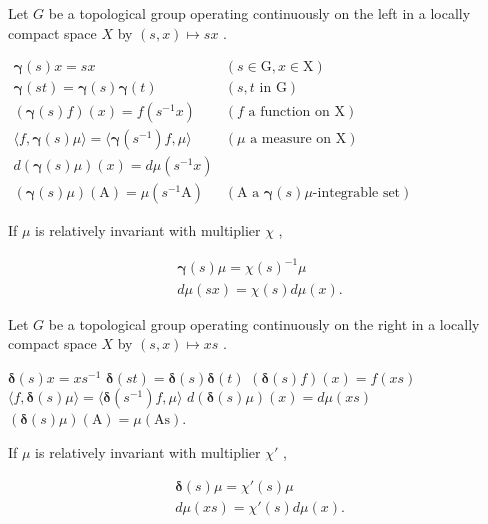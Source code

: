 
Let \(G\) be a topological group operating continuously on the left in a locally compact space \(X\) by \((s, x) \mapsto sx\) .

\(\begin{array}{ll}\pmb {\gamma}(s)x = sx & (s\in \mathrm{G},x\in \mathrm{X})\\ \pmb {\gamma}(st) = \pmb {\gamma}(s)\pmb {\gamma}(t) & (s,t\text{ in G})\\ (\pmb {\gamma}(s)f)(x) = f(s^{-1}x) & (f\text{ a function on X})\\ \langle f,\pmb {\gamma}(s)\mu \rangle = \langle \pmb {\gamma}(s^{-1})f,\mu \rangle & (\mu \text{ a measure on X})\\ d(\pmb {\gamma}(s)\mu)(x) = d\mu (s^{-1}x)\\ (\pmb {\gamma}(s)\mu)(\mathrm{A}) = \mu (s^{-1}\mathrm{A}) & (\mathrm{A}\text{ a }\pmb {\gamma}(s)\mu \text{-integrable set}) \end{array}\)

If \(\mu\) is relatively invariant with multiplier \(\chi\) ,

\[
\begin{array}{l} \pmb {\gamma} (s) \mu = \chi (s) ^ {- 1} \mu \\ d \mu (s x) = \chi (s) d \mu (x). \end{array}
\]

Let \(G\) be a topological group operating continuously on the right in a locally compact space \(X\) by \((s, x) \mapsto xs\) .

\(\pmb {\delta}(s)x = xs^{-1}\) \(\pmb {\delta}(st) = \pmb {\delta}(s)\pmb {\delta}(t)\) \((\pmb {\delta}(s)f)(x) = f(xs)\) \(\langle f,\pmb {\delta}(s)\mu \rangle = \langle \pmb {\delta}(s^{-1})f,\mu \rangle\) \(d(\pmb {\delta}(s)\mu)(x) = d\mu (xs)\) \((\pmb {\delta}(s)\mu)(\mathrm{A}) = \mu (\mathrm{As}).\)

If \(\mu\) is relatively invariant with multiplier \(\chi'\) ,

\[
\begin{array}{l} \pmb {\delta} (s) \mu = \chi' (s) \mu \\ d \mu (x s) = \chi' (s) d \mu (x). \end{array}
\]

